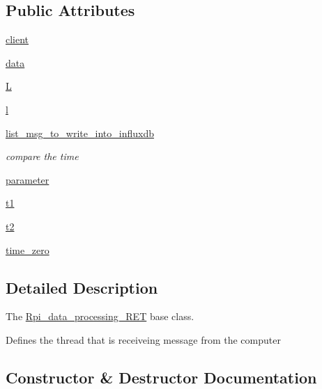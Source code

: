 \subsection*{Public Attributes}
\begin{DoxyCompactItemize}
\item 
\hyperlink{a00033_ad5bc32b75da65fe60067f501a4bb6665}{client}
\item 
\hyperlink{a00033_a511ae0b1c13f95e5f08f1a0dd3da3d93}{data}
\item 
\hyperlink{a00033_a67824ecf84f5816f07b74fa956bdbcd2}{L}
\item 
\hyperlink{a00033_a5b54c0a045f179bcbbbc9abcb8b5cd4c}{l}
\item 
\hyperlink{a00033_a34618055fe0360ecf68a0ca2d02d49d7}{list\+\_\+msg\+\_\+to\+\_\+write\+\_\+into\+\_\+influxdb}
\begin{DoxyCompactList}\small\item\em compare the time \end{DoxyCompactList}\item 
\hyperlink{a00033_a0d71b5c1dcca8d3fee88d6a11d3e2071}{parameter}
\item 
\hyperlink{a00033_a469994e78f66a44815c015b7f4b8b2f8}{t1}
\item 
\hyperlink{a00033_a24aeadb733f27244ec14e4cba82eeee9}{t2}
\item 
\hyperlink{a00033_a9037ca9407f51a787f95173288401aad}{time\+\_\+zero}
\end{DoxyCompactItemize}


\subsection{Detailed Description}
The \hyperlink{a00033}{Rpi\+\_\+data\+\_\+processing\+\_\+\+R\+ET} base class. 

Defines the thread that is receiveing message from the computer 

\subsection{Constructor \& Destructor Documentation}
\mbox{\label{a00033_a297f3b1ee42e9ff40c0ec84bb5996ea5}} 

